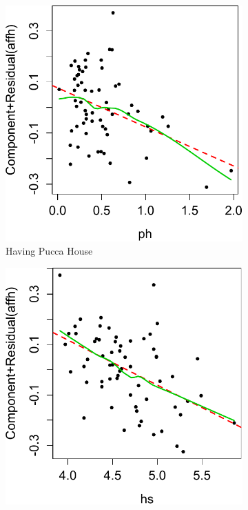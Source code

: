 \documentclass[preprint,review,12pt]{elsarticle}
\begin{document}
\begin{figure}[!htp]
\centering
\begin{subfigure}[t]{0.23\textwidth}
\centering
\includegraphics[width=\linewidth, keepaspectratio]{ph.pdf}
\caption{Having Pucca House}
\end{subfigure}
\begin{subfigure}[t]{0.23\textwidth}
\centering
\includegraphics[width=\linewidth, keepaspectratio]{hs.pdf}

\end{subfigure}
\end{figure}
\end{document}

